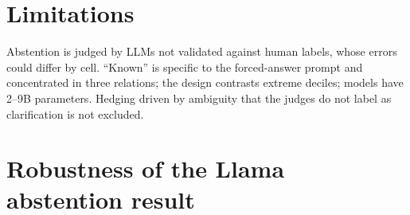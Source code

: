 \documentclass{article}
\begin{document}
\section{Limitations}

Abstention is judged by LLMs not validated against human labels, whose errors could differ by cell. ``Known'' is specific to the forced-answer prompt and concentrated in three relations; the design contrasts extreme deciles; models have 2--9B parameters. Hedging driven by ambiguity that the judges do not label as clarification is not excluded.




\appendix

\section{Robustness of the Llama abstention result}
\label{app:robust}
\end{document}
